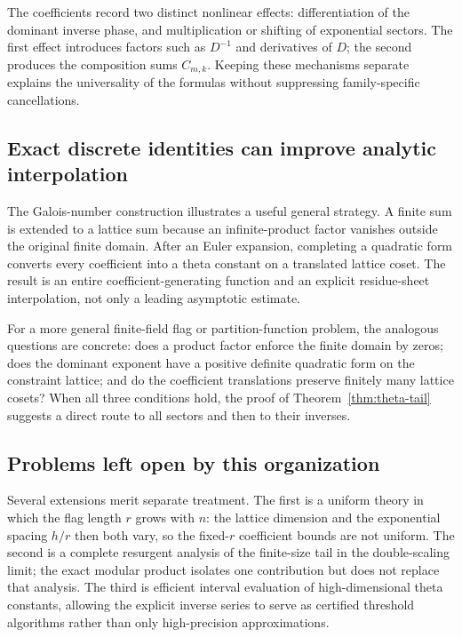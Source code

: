 \documentclass[11pt]{article}
\numberwithin{equation}{section}
\theoremstyle{definition}
\begin{document}
The coefficients record two distinct nonlinear effects: differentiation of the dominant inverse phase, and multiplication or shifting of exponential sectors. The first effect introduces factors such as $D^{-1}$ and derivatives of $D$; the second produces the composition sums $C_{m,k}$. Keeping these mechanisms separate explains the universality of the formulas without suppressing family-specific cancellations.

\subsection{Exact discrete identities can improve analytic interpolation}

The Galois-number construction illustrates a useful general strategy. A finite sum is extended to a lattice sum because an infinite-product factor vanishes outside the original finite domain. After an Euler expansion, completing a quadratic form converts every coefficient into a theta constant on a translated lattice coset. The result is an entire coefficient-generating function and an explicit residue-sheet interpolation, not only a leading asymptotic estimate.

For a more general finite-field flag or partition-function problem, the analogous questions are concrete: does a product factor enforce the finite domain by zeros; does the dominant exponent have a positive definite quadratic form on the constraint lattice; and do the coefficient translations preserve finitely many lattice cosets? When all three conditions hold, the proof of Theorem~\ref{thm:theta-tail} suggests a direct route to all sectors and then to their inverses.

\subsection{Problems left open by this organization}

Several extensions merit separate treatment. The first is a uniform theory in which the flag length $r$ grows with $n$: the lattice dimension and the exponential spacing $h/r$ then both vary, so the fixed-$r$ coefficient bounds are not uniform. The second is a complete resurgent analysis of the finite-size tail in the double-scaling limit; the exact modular product isolates one contribution but does not replace that analysis. The third is efficient interval evaluation of high-dimensional theta constants, allowing the explicit inverse series to serve as certified threshold algorithms rather than only high-precision approximations.
\end{document}
